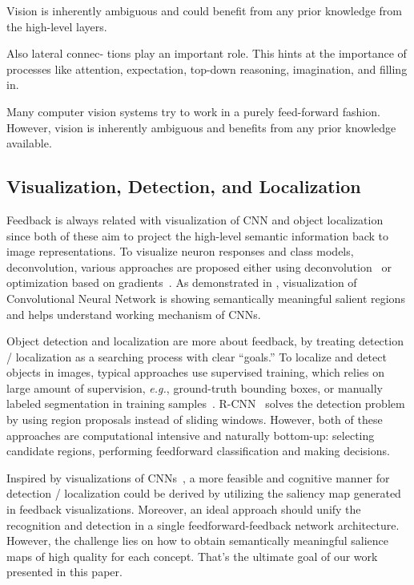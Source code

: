Vision is inherently ambiguous and could benefit from any prior knowledge from the high-level layers. 

Also lateral connec- tions play an important role. This hints at the importance of processes like attention, expectation, top-down reasoning, imagination, and filling in. 

Many computer vision systems try to work in a purely feed-forward fashion. However, vision is inherently ambiguous and benefits from any prior knowledge available. 

\subsection{Visualization, Detection, and Localization}

Feedback is always related with visualization of CNN and object localization since both of these aim to project the high-level semantic information back to image representations. To visualize neuron responses and class models, deconvolution, various approaches are proposed either using deconvolution~\cite{zeiler2014visualizing} or optimization based on gradients~\cite{simonyan2013deep}. As demonstrated in \cite{simonyan2013deep}, visualization of Convolutional Neural Network is showing semantically meaningful salient regions and helps understand working mechanism of CNNs.

Object detection and localization are more about feedback, by treating detection / localization as a searching process with clear ``goals.'' To localize and detect objects in images, typical approaches use supervised training, which relies on large amount of supervision, \emph{e.g.}, ground-truth bounding boxes, or manually labeled segmentation in training samples~\cite{erhan2014scalable}. R-CNN~\cite{girshick2014rich} solves the detection problem by using region proposals instead of sliding windows. However, both of these approaches are computational intensive and naturally bottom-up: selecting candidate regions, performing feedforward classification and making decisions.

Inspired by visualizations of CNNs~\cite{zeiler2014visualizing,simonyan2013deep}, a more feasible and cognitive manner for detection / localization could be derived by utilizing the saliency map generated in feedback visualizations. Moreover, an ideal approach should unify the recognition and detection in a single feedforward-feedback network architecture. However, the challenge lies on how to obtain semantically meaningful salience maps of high quality for each concept. That's the ultimate goal of our work presented in this paper.
